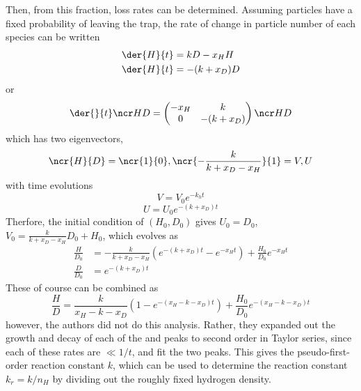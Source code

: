 \documentclass[12pt]{article}
\begin{document}
Then, from this fraction, loss rates can be determined. Assuming particles have a fixed probability of leaving the trap, the rate of change in particle number of each species can be written
\begin{subequations}
    \begin{align}
        \der{H}{t}&=kD-x_HH\\
        \der{H}{t}&=-(k+x_D)D
    \end{align}
\end{subequations}
or
\begin{equation}
    \der{}{t}\ncr H D = \begin{pmatrix}
        -x_H & k\\
        0 & -(k+x_D)
    \end{pmatrix}\ncr H D
\end{equation}
which has two eigenvectors,
\[ \ncr{H}{D}=\ncr{1}{0},\ncr{-\frac{k}{k+x_D-x_H}}{1}=V,U \]
with time evolutions
\[ V=V_0e^{-k_ht} \]
\[ U=U_0e^{-(k+x_D)t}\]
Therfore, the initial condition of \( (H_0, D_0) \) gives \( U_0=D_0 \), \( V_0=\frac{k}{k+x_D-x_H}D_0+H_0 \), which evolves as
\begin{subequations}
    \begin{align}
        \frac{H}{D_0}&=-\frac{k}{k+x_D-x_H}\left( e^{-(k+x_D)t}-e^{-x_Ht} \right) +\frac{H_0}{D_0}e^{-x_Ht}\\
        \frac{D}{D_0}&=e^{-(k+x_D)t}
    \end{align}
\end{subequations}
These of course can be combined as
\begin{equation}
    \frac{H}{D}=\frac{k}{x_H-k-x_D}\left(1-e^{-(x_H-k-x_D)t}\right)+\frac{H_0}{D_0}e^{-(x_H-k-x_D)t}
\end{equation}
however, the authors did not do this analysis. Rather, they expanded out the growth and decay of each of the  and  peaks to second order in Taylor series, since each of these rates are \(\ll 1/t\), and fit the two peaks. This gives the pseudo-first-order reaction constant \(k\), which can be used to determine the reaction constant \(k_r=k/n_H\) by dividing out the roughly fixed hydrogen density.
\end{document}
